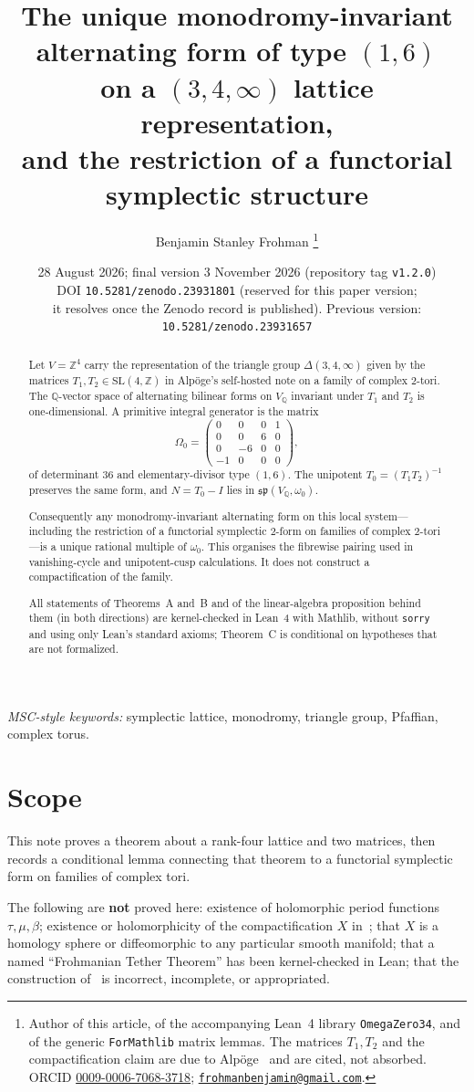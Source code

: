 \documentclass[11pt,a4paper]{article}
\title{The unique monodromy-invariant alternating form of type $(1,6)$\\
on a $(3,4,\infty)$ lattice representation,\\
and the restriction of a functorial symplectic structure}
\author{Benjamin Stanley Frohman%
\thanks{Author of this article, of the accompanying Lean~4 library
\texttt{OmegaZero34}, and of the generic \texttt{ForMathlib} matrix lemmas.
The matrices \(T_1,T_2\) and the compactification claim are due to
Alp\"oge~\protect\cite{AlpogeS6} and are cited, not absorbed. ORCID \href{https://orcid.org/0009-0006-7068-3718}{0009-0006-7068-3718}; \href{mailto:frohmanbenjamin@gmail.com}{\texttt{frohmanbenjamin@gmail.com}}.}}
\date{28 August 2026; final version 3 November 2026 (repository tag \texttt{v1.2.0})\\[4pt]
\normalsize DOI \texttt{10.5281/zenodo.23931801} (reserved for this paper version;\\ it resolves once the Zenodo record is published). Previous version: \texttt{10.5281/zenodo.23931657}}
\theoremstyle{definition}
\theoremstyle{remark}
\newcommand{\Q}{\mathbb{Q}}
\newcommand{\Z}{\mathbb{Z}}
\newcommand{\spq}{\mathfrak{sp}}
\begin{document}
\maketitle

\begin{abstract}
Let $V=\Z^4$ carry the representation of the triangle group $\Delta(3,4,\infty)$ given by the matrices $T_1,T_2\in\mathrm{SL}(4,\Z)$ in Alp\"oge's self-hosted note on a family of complex $2$-tori. The $\Q$-vector space of alternating bilinear forms on $V_{\Q}$ invariant under $T_1$ and $T_2$ is one-dimensional. A primitive integral generator is the matrix
\[
\Omega_0=\begin{pmatrix}0&0&0&1\\0&0&6&0\\0&-6&0&0\\-1&0&0&0\end{pmatrix},
\]
of determinant $36$ and elementary-divisor type $(1,6)$. The unipotent $T_0=(T_1T_2)^{-1}$ preserves the same form, and $N=T_0-I$ lies in $\spq(V_{\Q},\omega_0)$.

Consequently any monodromy-invariant alternating form on this local system---including the restriction of a functorial symplectic $2$-form on families of complex $2$-tori---is a unique rational multiple of $\omega_0$. This organises the fibrewise pairing used in vanishing-cycle and unipotent-cusp calculations. It does not construct a compactification of the family.

All statements of Theorems~A and~B and of the linear-algebra proposition behind them (in both directions) are kernel-checked in Lean~4 with Mathlib, without \texttt{sorry} and using only Lean's standard axioms; Theorem~C is conditional on hypotheses that are not formalized.
\end{abstract}

\noindent\textit{MSC-style keywords:} symplectic lattice, monodromy, triangle group, Pfaffian, complex torus.

\tableofcontents

\section{Scope}

This note proves a theorem about a rank-four lattice and two matrices, then records a conditional lemma connecting that theorem to a functorial symplectic form on families of complex tori.

The following are \textbf{not} proved here: existence of holomorphic period functions $\tau,\mu,\beta$; existence or holomorphicity of the compactification $X$ in~\cite{AlpogeS6}; that $X$ is a homology sphere or diffeomorphic to any particular smooth manifold; that a named ``Frohmanian Tether Theorem'' has been kernel-checked in Lean; that the construction of~\cite{AlpogeS6} is incorrect, incomplete, or appropriated.
\end{document}
